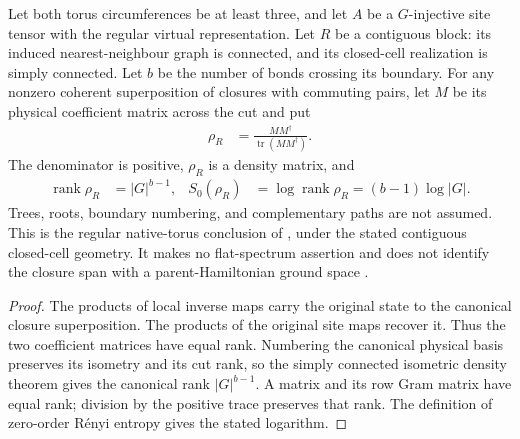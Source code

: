 \begin{lemma}%
    \label{thm:peps_regular_ginjective_simply_connected_entropy}
    \leanok
    Let both torus circumferences be at least three, and let $A$ be a
    $G$-injective site tensor with the regular virtual representation.
    Let $R$ be a contiguous block: its induced nearest-neighbour graph
    is connected, and its closed-cell realization is simply
    connected. Let $b$ be the number of bonds crossing its boundary.
    For any nonzero coherent superposition of closures with
    commuting pairs, let $M$ be its physical coefficient matrix across
    the cut and put
    \begin{align}
        \rho_R & =\frac{MM^\dagger}{\operatorname{tr}(MM^\dagger)}.
    \end{align}
    The denominator is positive, $\rho_R$ is a density matrix, and
    \begin{align}
        \operatorname{rank}\rho_R & =|G|^{b-1},                    &
        S_0(\rho_R)               & =\log\operatorname{rank}\rho_R
        =(b-1)\log|G|.
    \end{align}
    Trees, roots, boundary numbering, and complementary paths are not
    assumed. This is the regular native-torus conclusion of
    \cite[Corollary~6.10]{Schuch2010PEPS}, under the stated contiguous
    closed-cell geometry. It makes no flat-spectrum assertion and does
    not identify the closure span with a parent-Hamiltonian ground space
    \cite{gap:rmp_peps_quantum_double_g_isometry}.
\end{lemma}

\begin{proof}\leanok
    The products of local inverse maps carry the original state to
    the canonical closure superposition. The products of the original
    site maps recover it. Thus the two coefficient matrices have equal rank. Numbering the canonical physical basis preserves its
    isometry and its cut rank, so the simply connected isometric
    density theorem gives the canonical rank $|G|^{b-1}$.
    A matrix and its row Gram matrix have equal rank; division by the
    positive trace preserves that rank. The definition of zero-order
    Rényi entropy gives the stated logarithm.
\end{proof}
